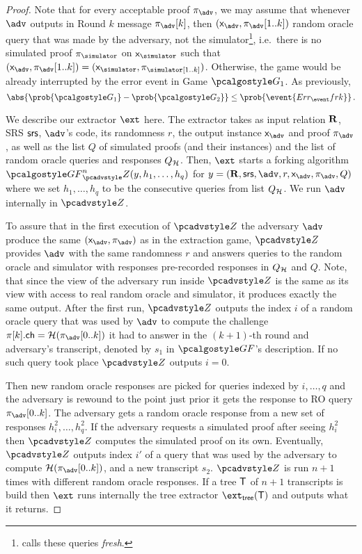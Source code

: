 \documentclass[runningheads,11pt]{llncs}
\begin{document}
\begin{proof}
   Note that for every acceptable proof
  $\zkproof_{\advse}$, we may assume that whenever $\advse$ outputs in Round $k$
  message $\zkproof_{\advse}[k]$, then
  $(\inp_{\advse}, \zkproof_{\advse}[1..k])$ random oracle query that was made
  by the adversary, not the simulator\footnote{\cite{INDOCRYPT:FKMV12} calls
    these queries \emph{fresh}.}, i.e.~there is no simulated proof
  $\zkproof_\simulator$ on $\inp_\simulator$ such that
  $(\inp_{\advse}, \zkproof_{\advse} [1..k]) = (\inp_\simulator,
  \zkproof_\simulator[1..k])$. Otherwise, the game would be already interrupted
  by the error event in Game $\game{1}$.  As previously,
\[
  \abs{\prob{\game{1}} - \prob{\game{2}}} \leq \prob{\event{\errfrk}}\,.
\]

We describe our extractor $\ext$ here. The extractor takes as input relation
$\mathbf{R}$, SRS $\mathsf{srs}$, $\advse$'s code, its randomness $r$, the output instance
$\inp_{\advse}$ and proof $\zkproof_{\advse}$, as well as the list $Q$ of
simulated proofs (and their instances) and the list of random oracle queries and
responses $Q_{\mathcal{H}}$. Then, $\ext$ starts a forking algorithm
$\genforking^{n}_\zdv(y,h_1, \ldots, h_q)$ for
$y = (\REL, \srs, \advse, r, \inp_{\advse}, \zkproof_{\advse}, Q)$ where we set
$h_1, \ldots, h_q$ to be the consecutive queries from list $Q_{\mathcal{H}}$. We run
$\advse$ internally in $\zdv$.%

To assure that in the first execution of $\zdv$ the adversary $\advse$ produce
the same $(\inp_{\advse}, \zkproof_{\advse})$ as in the extraction game, $\zdv$
provides $\advse$ with the same randomness $r$ and answers queries to the random
oracle and simulator with responses pre-recorded responses in $Q_{\mathcal{H}}$ and $Q$.
%
Note, that since the view of the adversary run inside $\zdv$ is the same as its
view with access to real random oracle and simulator, it produces exactly the
same output. After the first run, $\zdv$ outputs the index $i$ of a random oracle
query that was used by $\advse$ to compute the challenge $\zkproof[k].\ch =
\ro(\zkproof_{\advse}[0..k])$ it had to answer in the $(k + 1)$-th round and
adversary's transcript, denoted by $s_1$ in $\genforking$'s description. If no
such query took place $\zdv$ outputs $i = 0$.

Then new random oracle responses are picked for queries indexed by
$i, \ldots, q$ and the adversary is rewound to the point just prior it gets the
response to RO query $\zkproof_{\advse}[0..k]$. The adversary gets a random
oracle response from a new set of responses $h^2_i, \ldots, h^2_q$. If the
adversary requests a simulated proof after seeing $h^2_i$ then $\zdv$ computes
the simulated proof on its own. Eventually, $\zdv$ outputs index $i'$ of a query
that was used by the adversary to compute $\ro(\zkproof_{\advse}[0..k])$, and a
new transcript $s_2$. $\zdv$ is run $n + 1$ times with different random oracle
responses. If a tree $\mathsf{T}$ of $n + 1$ transcripts is build then $\ext$
runs internally the tree extractor $\extt(\tree)$ and outputs what it returns.


\end{proof}
\end{document}

